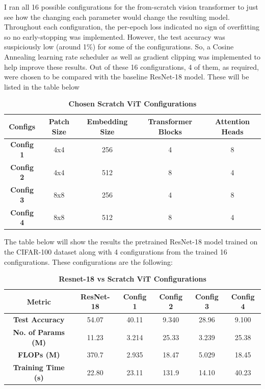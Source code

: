 \documentclass[a4paper]{article}
\begin{document}
I ran all 16 possible configurations for the from-scratch vision transformer to just see how the changing each parameter would change the resulting model. Throughout each configuration, the per-epoch loss indicated no sign of overfitting so no early-stopping was implemented. However, the test accuracy was suspiciously low (around 1\%) for some of the configurations. So, a Cosine Annealing learning rate scheduler as well as gradient clipping was implemented to help improve these results. Out of these 16 configurations, 4 of them, as required, were chosen to be compared with the baseline ResNet-18 model. These will be listed in the table below

\begin{table}[H]
    \centering
    \caption{\textbf{Chosen Scratch ViT Configurations}}
    \label{tab:4configs}
    \begin{tabular}{| c || c | c | c | c |}
        \hline
        \textbf{Configs} & \textbf{Patch Size} & \textbf{Embedding Size} & \textbf{Transformer Blocks} & \textbf{Attention Heads} \\
        \hline
        \textbf{Config 1} & 4x4 & 256 & 4 & 8 \\
        \hline
        \textbf{Config 2} & 4x4 & 512 & 8 & 4 \\
        \hline
        \textbf{Config 3} & 8x8 & 256 & 4 & 8 \\
        \hline
        \textbf{Config 4} & 8x8 & 512 & 8 & 4 \\
        \hline
    \end{tabular}
\end{table}

The table below will show the results the pretrained ResNet-18 model trained on the CIFAR-100 dataset along with 4 configurations from the trained 16 configurations. These configurations are the following:

\begin{table}[H]
    \centering
    \caption{\textbf{Resnet-18 vs Scratch ViT Configurations}}
    \label{tab:resnet18}
    \begin{tabular}{| c || c | c | c | c | c |}
        \hline
        \textbf{Metric}            & \textbf{ResNet-18} & \textbf{Config 1} & \textbf{Config 2} & \textbf{Config 3} & \textbf{Config 4} \\
        \hline
        \textbf{Test Accuracy}     &        54.07       &       40.11       &       9.340       &       28.96       &       9.100       \\
        \hline
        \textbf{No. of Params (M)} &        11.23       &       3.214       &       25.33       &       3.239       &       25.38       \\
        \hline
        \textbf{FLOPs (M)}         &        370.7       &       2.935       &       18.47       &       5.029       &       18.45       \\
        \hline
        \textbf{Training Time (s)} &        22.80       &       23.11       &       131.9       &       14.10       &       40.23       \\
        \hline
    \end{tabular}
\end{table}
\end{document}
